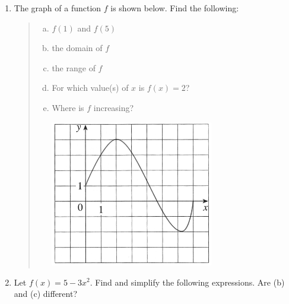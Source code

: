 \documentclass[11pt,fleqn]{article}
\begin{document}
\renewcommand{\headrulewidth}{0pt}
\newcommand{\blank}[1]{\rule{#1}{0.75pt}}
\renewcommand{\d}{\displaystyle}
\vspace*{-0.7in}
\begin{center}
  \large {}
\end{center}


\begin{enumerate}
\item The graph of
a function $f$ is shown below. Find the following:

\begin{quote}
  \begin{multicols}{2}{
      \vspace*{-0.55in}
      \begin{enumerate}[a)]
      \item $f(1)$ and $f(5)$
      \item the domain of $f$
      \item the range of $f$
      \item For which value(s) of $x$ is $f(x) = 2$?
      \item Where is $f$ increasing?
\columnbreak
\begin{center}
  \includegraphics[width=2.8in]{1-1-fig-6}
\end{center}
      \end{enumerate}}
\end{multicols}
\end{quote}

\vspace{.3in}

\item  Let $f(x) = 5-3x^2.$ Find and simplify the following expressions. Are (b) and (c) different? 


\end{enumerate}
\end{document}
